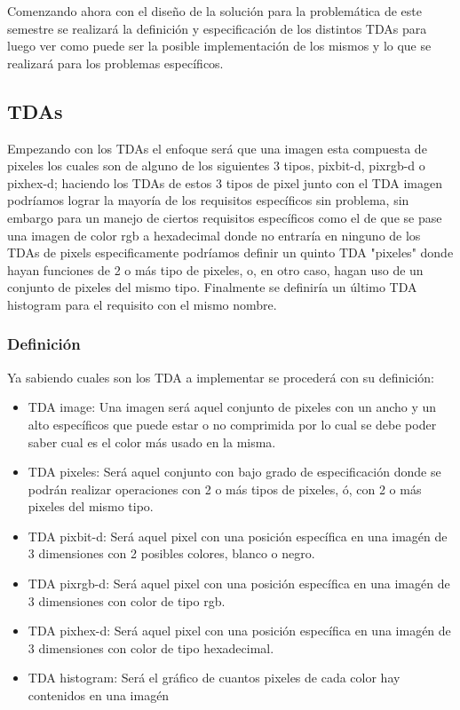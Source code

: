 Comenzando ahora con el diseño de la solución para la problemática de este semestre se realizará la definición y especificación
de los distintos TDAs para luego ver como puede ser la posible implementación de los mismos y lo que se realizará para los problemas
específicos.

\subsection{TDAs}
 Empezando con los TDAs el enfoque será que una imagen esta compuesta de pixeles los cuales
  son de alguno de los siguientes 3 tipos, pixbit-d, pixrgb-d o pixhex-d; haciendo los TDAs de estos 3 tipos
  de pixel junto con el TDA imagen podríamos lograr la mayoría de los requisitos específicos sin problema, sin 
  embargo para un manejo de ciertos requisitos específicos como el de que se pase una imagen de color rgb a hexadecimal
  donde no entraría en ninguno de los TDAs de pixels especificamente podríamos definir un quinto TDA "pixeles" donde hayan
  funciones de 2 o más tipo de pixeles, o, en otro caso, hagan uso de un conjunto de pixeles del mismo tipo. Finalmente se definiría
  un último TDA histogram para el requisito con el mismo nombre.\\

  \subsubsection{Definición}
    Ya sabiendo cuales son los TDA a implementar se procederá con su definición:
    \begin{itemize}
      \item TDA image: Una imagen será aquel conjunto de pixeles con un ancho y un alto específicos
        que puede estar o no comprimida por lo cual se debe poder saber cual es el color más usado en la misma.
      \item TDA pixeles: Será aquel conjunto con bajo grado de especificación donde se podrán realizar operaciones con 2 o más tipos de pixeles, ó,
        con 2 o más pixeles del mismo tipo.
      \item TDA pixbit-d: Será aquel pixel con una posición específica en una imagén de 3 dimensiones con 2 posibles colores, blanco o negro.
      \item TDA pixrgb-d: Será aquel pixel con una posición específica en una imagén de 3 dimensiones con color de tipo rgb.
      \item TDA pixhex-d: Será aquel pixel con una posición específica en una imagén de 3 dimensiones con color de tipo hexadecimal.
      \item TDA histogram: Será el gráfico de cuantos pixeles de cada color hay contenidos en una imagén
    \end{itemize}

